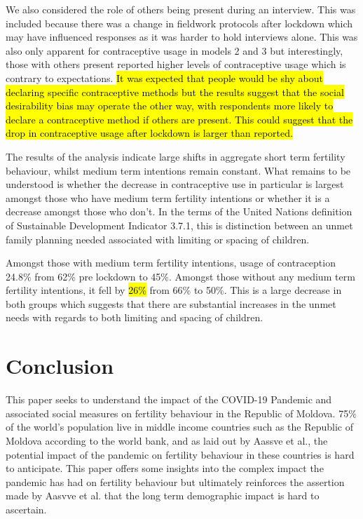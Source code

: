 \documentclass[10pt,letterpaper]{article}
\begin{document}
We also considered the role of others being present during an interview. This was included because there was a change in fieldwork protocols after lockdown which may have influenced responses as it was harder to hold interviews alone. This was also only apparent for contraceptive usage in models 2 and 3 but interestingly, those with others present reported higher levels of contraceptive usage which is contrary to expectations. \hl{It was expected that people would be shy about declaring specific contraceptive methods but the results suggest that the social desirability bias may operate the other way, with respondents more likely to declare a contraceptive method if others are present. This could suggest that the drop in contraceptive usage after lockdown is larger than reported.}

The results of the analysis indicate large shifts in aggregate short term fertility behaviour, whilst medium term intentions remain constant. What remains to be understood is whether the decrease in contraceptive use in particular is largest amongst those who have medium term fertility intentions or whether it is a decrease amongst those who don't. In the terms of the United Nations definition of Sustainable Development Indicator 3.7.1, this is distinction between an unmet family planning needed associated with limiting or spacing of children. 

Amongst those with medium term fertility intentions, usage of contraception 24.8\% from 62\% pre lockdown to 45\%. Amongst those without any medium term fertility intentions, it fell by \hl{26\%} from 66\% to 50\%. This is a large decrease in both groups which suggests that there are substantial increases in the unmet needs with regards to both limiting and spacing of children.  

\newpage
\section*{Conclusion}\label{sec:conclusion}

This paper seeks to understand the impact of the COVID-19 Pandemic and associated social measures on fertility behaviour in the Republic of Moldova. 75\% of the world's population live in middle income countries such as the Republic of Moldova according to the world bank, and as laid out by Aassve et al., the potential impact of the pandemic on fertility behaviour in these countries is hard to anticipate. This paper offers some insights into the complex impact the pandemic has had on fertility behaviour but ultimately reinforces the assertion made by Aasvve et al. that the long term demographic impact is hard to ascertain. 
\end{document}
